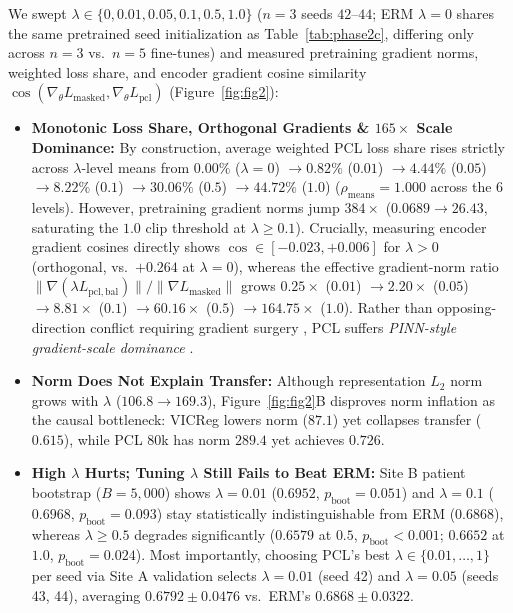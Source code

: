 \documentclass[10pt,twocolumn]{article}
\begin{document}
We swept $\lambda \in \{0, 0.01, 0.05, 0.1, 0.5, 1.0\}$ ($n=3$ seeds $42\text{--}44$; ERM $\lambda=0$ shares the same pretrained seed initialization as Table~\ref{tab:phase2c}, differing only across $n=3$ vs.\ $n=5$ fine-tunes) and measured pretraining gradient norms, weighted loss share, and encoder gradient cosine similarity $\cos(\nabla_\theta L_{\mathrm{masked}}, \nabla_\theta L_{\mathrm{pcl}})$ (Figure~\ref{fig:fig2}):
\begin{itemize}
    \item \textbf{Monotonic Loss Share, Orthogonal Gradients \& $165\times$ Scale Dominance:} By construction, average weighted PCL loss share rises strictly across $\lambda$-level means from $0.00\%$ ($\lambda=0$) $\to 0.82\%$ ($0.01$) $\to 4.44\%$ ($0.05$) $\to 8.22\%$ ($0.1$) $\to 30.06\%$ ($0.5$) $\to 44.72\%$ ($1.0$) ($\rho_{\mathrm{means}} = 1.000$ across the 6 levels). However, pretraining gradient norms jump $384\times$ ($0.0689 \to 26.43$, saturating the $1.0$ clip threshold at $\lambda \ge 0.1$). Crucially, measuring encoder gradient cosines directly shows $\cos \in [-0.023, +0.006]$ for $\lambda > 0$ (orthogonal, vs.\ $+0.264$ at $\lambda=0$), whereas the effective gradient-norm ratio $\|\nabla(\lambda L_{\mathrm{pcl,bal}})\| / \|\nabla L_{\mathrm{masked}}\|$ grows $0.25\times$ ($0.01$) $\to 2.20\times$ ($0.05$) $\to 8.81\times$ ($0.1$) $\to 60.16\times$ ($0.5$) $\to 164.75\times$ ($1.0$). Rather than opposing-direction conflict requiring gradient surgery \cite{yu2020gradient}, PCL suffers \emph{PINN-style gradient-scale dominance} \cite{wang2021understanding,krishnapriyan2021characterizing}.
    \item \textbf{Norm Does Not Explain Transfer:} Although representation $L_2$ norm grows with $\lambda$ ($106.8 \to 169.3$), Figure~\ref{fig:fig2}B disproves norm inflation as the causal bottleneck: VICReg lowers norm ($87.1$) yet collapses transfer ($0.615$), while PCL 80k has norm $289.4$ yet achieves $0.726$.
    \item \textbf{High $\lambda$ Hurts; Tuning $\lambda$ Still Fails to Beat ERM:} Site B patient bootstrap ($B=5{,}000$) shows $\lambda=0.01$ ($0.6952$, $p_{\mathrm{boot}}=0.051$) and $\lambda=0.1$ ($0.6968$, $p_{\mathrm{boot}}=0.093$) stay statistically indistinguishable from ERM ($0.6868$), whereas $\lambda \ge 0.5$ degrades significantly ($0.6579$ at $0.5$, $p_{\mathrm{boot}}<0.001$; $0.6652$ at $1.0$, $p_{\mathrm{boot}}=0.024$). Most importantly, choosing PCL's best $\lambda \in \{0.01,\dots,1\}$ per seed via Site A validation selects $\lambda=0.01$ (seed 42) and $\lambda=0.05$ (seeds 43, 44), averaging $\mathbf{0.6792 \pm 0.0476}$ vs.\ ERM's $\mathbf{0.6868 \pm 0.0322}$.
\end{itemize}
\end{document}
